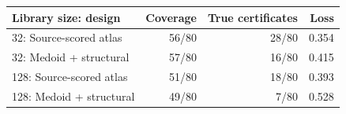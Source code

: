 \begin{tabular}{lrrr}
\toprule
Library size: design & Coverage & True certificates & Loss \\
\midrule
32: Source-scored atlas & 56/80 & 28/80 & 0.354 \\
32: Medoid + structural & 57/80 & 16/80 & 0.415 \\
128: Source-scored atlas & 51/80 & 18/80 & 0.393 \\
128: Medoid + structural & 49/80 & 7/80 & 0.528 \\
\bottomrule
\end{tabular}
